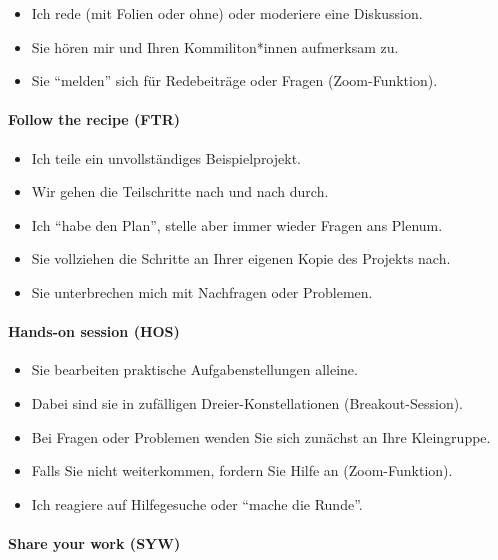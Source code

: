 \documentclass[
  ngerman,
]{article}
\providecommand{\tightlist}{%
  \setlength{\itemsep}{0pt}\setlength{\parskip}{0pt}}
\begin{document}
\begin{itemize}
\tightlist
\item
  Ich rede (mit Folien oder ohne) oder moderiere eine Diskussion.
\item
  Sie hören mir und Ihren Kommiliton*innen aufmerksam zu.
\item
  Sie ``melden'' sich für Redebeiträge oder Fragen (Zoom-Funktion).
\end{itemize}

\hypertarget{follow-the-recipe-ftr}{%
\paragraph{Follow the recipe (FTR)}\label{follow-the-recipe-ftr}}

\begin{itemize}
\tightlist
\item
  Ich teile ein unvollständiges Beispielprojekt.
\item
  Wir gehen die Teilschritte nach und nach durch.
\item
  Ich ``habe den Plan'', stelle aber immer wieder Fragen ans Plenum.
\item
  Sie vollziehen die Schritte an Ihrer eigenen Kopie des Projekts nach.
\item
  Sie unterbrechen mich mit Nachfragen oder Problemen.
\end{itemize}

\hypertarget{hands-on-session-hos}{%
\paragraph{Hands-on session (HOS)}\label{hands-on-session-hos}}

\begin{itemize}
\tightlist
\item
  Sie bearbeiten praktische Aufgabenstellungen alleine.
\item
  Dabei sind sie in zufälligen Dreier-Konstellationen (Breakout-Session).
\item
  Bei Fragen oder Problemen wenden Sie sich zunächst an Ihre Kleingruppe.
\item
  Falls Sie nicht weiterkommen, fordern Sie Hilfe an (Zoom-Funktion).
\item
  Ich reagiere auf Hilfegesuche oder ``mache die Runde''.
\end{itemize}

\hypertarget{share-your-work-syw}{%
\paragraph{Share your work (SYW)}\label{share-your-work-syw}}
\end{document}
